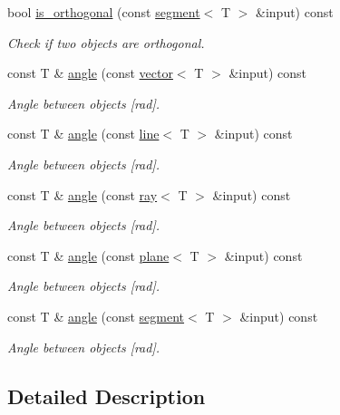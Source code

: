 \begin{DoxyCompactItemize}
bool \hyperlink{classddd_1_1segment_a9751dcbeabce6f092543f6799b822c02}{is\+\_\+orthogonal} (const \hyperlink{classddd_1_1segment}{segment}$<$ T $>$ \&input) const
\begin{DoxyCompactList}\small\item\em Check if two objects are orthogonal. \end{DoxyCompactList}\item 
const T \& \hyperlink{classddd_1_1segment_a87c35ebcb1818d0958e51868a60c4181}{angle} (const \hyperlink{classddd_1_1vector}{vector}$<$ T $>$ \&input) const
\begin{DoxyCompactList}\small\item\em Angle between objects \mbox{[}rad\mbox{]}. \end{DoxyCompactList}\item 
const T \& \hyperlink{classddd_1_1segment_a63576e5f0bca9dc67f90a7b246345ff7}{angle} (const \hyperlink{classddd_1_1line}{line}$<$ T $>$ \&input) const
\begin{DoxyCompactList}\small\item\em Angle between objects \mbox{[}rad\mbox{]}. \end{DoxyCompactList}\item 
const T \& \hyperlink{classddd_1_1segment_a5c7ab773bb94ce6e8593a3517765efe2}{angle} (const \hyperlink{classddd_1_1ray}{ray}$<$ T $>$ \&input) const
\begin{DoxyCompactList}\small\item\em Angle between objects \mbox{[}rad\mbox{]}. \end{DoxyCompactList}\item 
const T \& \hyperlink{classddd_1_1segment_ab82b51c357f533765e5141cbeeac2800}{angle} (const \hyperlink{classddd_1_1plane}{plane}$<$ T $>$ \&input) const
\begin{DoxyCompactList}\small\item\em Angle between objects \mbox{[}rad\mbox{]}. \end{DoxyCompactList}\item 
const T \& \hyperlink{classddd_1_1segment_a0b19e53d6aab0dc65290874e05fbb042}{angle} (const \hyperlink{classddd_1_1segment}{segment}$<$ T $>$ \&input) const
\begin{DoxyCompactList}\small\item\em Angle between objects \mbox{[}rad\mbox{]}. \end{DoxyCompactList}\end{DoxyCompactItemize}


\subsection{Detailed Description}

